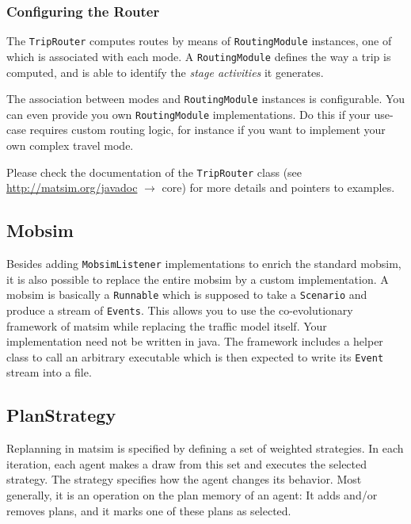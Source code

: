 \subsubsection{Configuring the Router}
The \lstinline{TripRouter} computes routes by means of \lstinline{RoutingModule}
instances, one of which is associated with each mode.
A \lstinline{RoutingModule} defines the way a trip is computed,
and is able to identify the \emph{stage activities} it generates.

The association between modes and \lstinline{RoutingModule} instances is configurable.
You can even provide you own \lstinline{RoutingModule} implementations.
Do this if your use-case requires custom routing logic, for instance if you
want to implement your own complex travel mode.

Please check the documentation of the \lstinline{TripRouter} class  (see \url{http://matsim.org/javadoc} $\to$ core) for more details and pointers to examples.

\subsection{Mobsim}
\label{sec:mobsim-extension-point}
Besides adding \lstinline|MobsimListener| implementations to enrich the standard \gls{mobsim}, it is also possible to replace
the entire \gls{mobsim} by a custom implementation. A \gls{mobsim} is basically
a \lstinline|Runnable| which is supposed to take a \lstinline|Scenario| and
produce a stream of \lstinline|Events|.
This allows you to use the co-evolutionary framework of \gls{matsim} while replacing the traffic model itself.
Your implementation need not be written in \gls{java}. The framework includes a helper class to call an arbitrary
executable which is then expected to write its \lstinline|Event| stream into a file. 

\subsection{PlanStrategy}
\label{sec:replanning-extension-point}
Replanning in \gls{matsim} is specified by defining a set of weighted strategies. In each
iteration, each agent makes a draw from this set and executes the selected strategy. The
strategy specifies how the agent changes its behavior. Most generally, it is an operation on the plan memory
of an agent: It adds and/or removes plans, and it marks one of these plans as selected.

